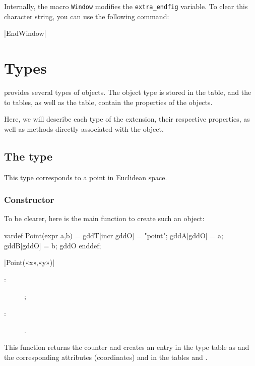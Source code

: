 \documentclass[a4paper,english]{article}
\begin{document}
Internally, the macro \lstinline|Window| modifies the
\lstinline+extra_endfig+ variable.
To clear this character string, you can use the following command:
\begin{colourband}
\macro|EndWindow|
\end{colourband}

\section{Types}\label{sec:types}

\mpgeomdd provides several types of objects. The object type is stored in the  table, and the  to  tables, as well as the  table, contain the properties of the objects.

Here, we will describe each type of the \mpgeomdd extension, their respective properties, as well as methods directly associated with the object.

\subsection{The  type}

This type corresponds to a point in Euclidean space.

\subsubsection{Constructor}

To be clearer, here is the main function to create such an object:
%
\begin{mpcode}
vardef Point(expr a,b) =
  gddT[incr gddO] = "point";
  gddA[gddO] = a; gddB[gddO] = b; gddO
enddef;
\end{mpcode}

\begin{colourband}
\macro|Point(«x»,«y»)|
\begin{description}
  \item[:] ;
  \item[:] .
\end{description}
\end{colourband}
\bigskip


This function returns the counter  and creates an entry in the type table as  and the corresponding attributes (coordinates)  and  in the tables  and .
\end{document}
